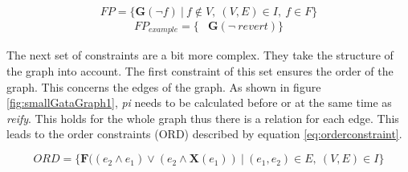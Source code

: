\documentclass{article}
\begin{document}
\begin{equation}
    FP = \{ \textbf{G}(\neg f)    \ |\ f \notin V,\ (V,E) \in I,\ f \in F\} \label{eq:functionprevention}
\end{equation}
\begin{align*}
    FP_{example} = \{& \textbf{G}(\neg\ revert)\} 
\end{align*}















 
The next set of constraints are a bit more complex. They take the structure of the graph into account. The first constraint of this set ensures the order of the graph. This concerns the edges of the graph. As shown in figure \ref{fig:smallGataGraph1}, \textit{pi} needs to be calculated before or at the same time as \textit{reify}. This holds for the whole graph thus there is a relation for each edge. This leads to the order constraints (ORD) described by equation \ref{eq:orderconstraint}.

\begin{equation}
    ORD = \{\textbf{F}((e_2 \wedge e_1) \vee (e_2 \wedge \textbf{X} (e_1)  )\  |\  (e_1,e_2) \in  E ,\ (V,E) \in  I  \} \label{eq:orderconstraint}
\end{equation}
\end{document}
